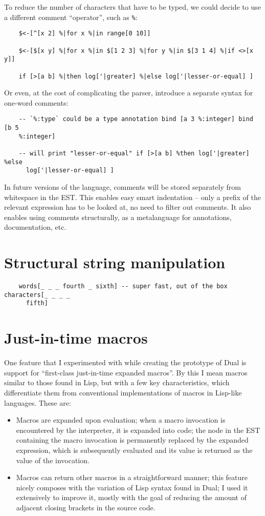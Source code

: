 To reduce the number of characters that have to be typed, we could decide to use
a different comment ``operator'', such as \texttt{\%}:
\begin{lstlisting}
    $<-[^[x 2] %|for x %|in range[0 10]]
    
    $<-[$[x y] %|for x %|in $[1 2 3] %|for y %|in $[3 1 4] %|if <>[x y]]

    if [>[a b] %|then log['|greater] %|else log['|lesser-or-equal] ]
\end{lstlisting}

Or even, at the cost of complicating the parser, introduce a separate syntax for
one-word comments:
\begin{lstlisting}
    -- `%:type` could be a type annotation bind [a 3 %:integer] bind [b 5
    %:integer]

    -- will print "lesser-or-equal" if [>[a b] %then log['|greater] %else
      log['|lesser-or-equal] ]
\end{lstlisting}

In future versions of the language, comments will be stored separately from
whitespace in the EST. This enables easy smart indentation -- only a prefix of
the relevant expression has to be looked at, no need to filter out comments. It
also enables using comments structurally, as a metalanguage for annotations,
documentation, etc.

\section{Structural string manipulation}
\begin{lstlisting}
    words[_ _ _ fourth _ sixth] -- super fast, out of the box characters[_ _ _ _
      fifth]
\end{lstlisting}

\section{Just-in-time macros}
One feature that I experimented with while creating the prototype of Dual is
support for ``first-class just-in-time expanded macros''. By this I mean macros
similar to those found in Lisp, but with a few key characteristics, which
differentiate them from conventional implementations of macros in Lisp-like
languages. These are:
\begin{itemize}
	\item Macros are expanded upon evaluation; when a macro invocation is
          encountered by the interpreter, it is expanded into code; the node in
          the EST containing the macro invocation is permanently replaced by the
          expanded expression, which is subsequently evaluated and its value is
          returned as the value of the invocation.
	\item Macros can return other macros in a straightforward manner; this
          feature nicely composes with the variation of Lisp syntax found in
          Dual; I used it extensively to improve it, mostly with the goal of
          reducing the amount of adjacent closing brackets in the source code.
\end{itemize}

